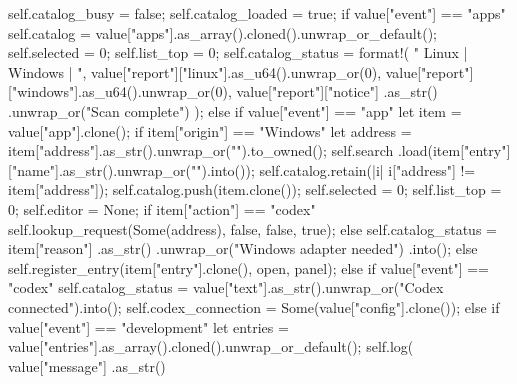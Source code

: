 {{{{{                    self.catalog_busy = false;
                    self.catalog_loaded = true;
                    if value["event"] == "apps" {
                        self.catalog = value["apps"].as_array().cloned().unwrap_or_default();
                        self.selected = 0;
                        self.list_top = 0;
                        self.catalog_status = format!(
                            "{} Linux | {} Windows | {}",
                            value["report"]["linux"].as_u64().unwrap_or(0),
                            value["report"]["windows"].as_u64().unwrap_or(0),
                            value["report"]["notice"]
                                .as_str()
                                .unwrap_or("Scan complete")
                        );
                    } else if value["event"] == "app" {
                        let item = value["app"].clone();
                        if item["origin"] == "Windows" {
                            let address = item["address"].as_str().unwrap_or("").to_owned();
                            self.search
                                .load(item["entry"]["name"].as_str().unwrap_or("").into());
                            self.catalog.retain(|i| i["address"] != item["address"]);
                            self.catalog.push(item.clone());
                            self.selected = 0;
                            self.list_top = 0;
                            self.editor = None;
                            if item["action"] == "codex" {
                                self.lookup_request(Some(address), false, false, true);
                            } else {
                                self.catalog_status = item["reason"]
                                    .as_str()
                                    .unwrap_or("Windows adapter needed")
                                    .into();
                            }
                        } else {
                            self.register_entry(item["entry"].clone(), open, panel);
                        }
                    } else if value["event"] == "codex" {
                        self.catalog_status =
                            value["text"].as_str().unwrap_or("Codex connected").into();
                        self.codex_connection = Some(value["config"].clone());
                    } else if value["event"] == "development" {
                        let entries = value["entries"].as_array().cloned().unwrap_or_default();
                        self.log(
                            value["message"]
                                .as_str()
}}}}}}
